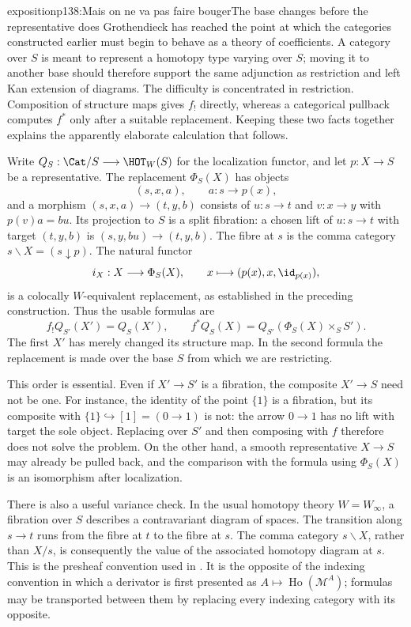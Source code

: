 
\begin{dcomment}{exposition}{p138:Mais on ne va pas faire bouger}{The base changes before the representative does}
Grothendieck has reached the point at which the categories constructed earlier must begin to behave as a theory of coefficients. A category over $S$ is meant to represent a homotopy type varying over $S$; moving it to another base should therefore support the same adjunction as restriction and left Kan extension of diagrams. The difficulty is concentrated in restriction. Composition of structure maps gives $f_!$ directly, whereas a categorical pullback computes $f^*$ only after a suitable replacement. Keeping these two facts together explains the apparently elaborate calculation that follows.

Write $Q_S:\Cat/S\longrightarrow\HOT_W(S)$ for the localization functor, and let $p:X\longrightarrow S$ be a representative. The replacement $\Phi_S(X)$ has objects
\[
 (s,x,a),\qquad a:s\longrightarrow p(x),
\]
and a morphism $(s,x,a)\longrightarrow(t,y,b)$ consists of $u:s\longrightarrow t$ and $v:x\longrightarrow y$ with $p(v)a=bu$. Its projection to $S$ is a split fibration: a chosen lift of $u:s\longrightarrow t$ with target $(t,y,b)$ is $(s,y,bu)\longrightarrow(t,y,b)$. The fibre at $s$ is the comma category $s\backslash X=(s\downarrow p)$. The natural functor
\[
 i_X:X\longrightarrow\Phi_S(X),\qquad
 x\longmapsto(p(x),x,\id_{p(x)}),
\]
is a colocally $W$-equivalent replacement, as established in the preceding construction. Thus the usable formulas are
\[
 f_!Q_{S'}(X')=Q_S(X'),\qquad
 f^*Q_S(X)=Q_{S'}(\Phi_S(X)\times_S S').
\]
The first $X'$ has merely changed its structure map. In the second formula the replacement is made over the base $S$ from which we are restricting.

This order is essential. Even if $X'\longrightarrow S'$ is a fibration, the composite $X'\longrightarrow S$ need not be one. For instance, the identity of the point $\{1\}$ is a fibration, but its composite with $\{1\}\hookrightarrow[1]=(0\to1)$ is not: the arrow $0\to1$ has no lift with target the sole object. Replacing over $S'$ and then composing with $f$ therefore does not solve the problem. On the other hand, a smooth representative $X\longrightarrow S$ may already be pulled back, and the comparison with the formula using $\Phi_S(X)$ is an isomorphism after localization.

There is also a useful variance check. In the usual homotopy theory $W=W_\infty$, a fibration over $S$ describes a contravariant diagram of spaces. The transition along $s\to t$ runs from the fibre at $t$ to the fibre at $s$. The comma category $s\backslash X$, rather than $X/s$, is consequently the value of the associated homotopy diagram at $s$. This is the presheaf convention used in \citet[Introduction, pp.~2--3]{Maltsiniotis2005Asphericite}. It is the opposite of the indexing convention in which a derivator is first presented as $A\mapsto\operatorname{Ho}(\mathcal M^A)$; formulas may be transported between them by replacing every indexing category with its opposite.


\end{dcomment}
